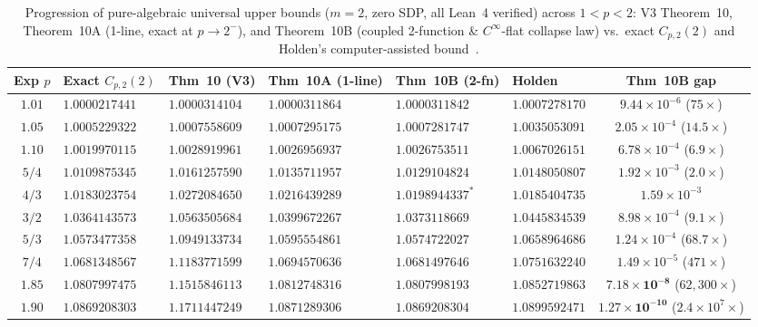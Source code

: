 \documentclass[10pt,letterpaper]{article}
\begin{document}
\begin{table}[htbp]
\centering
\caption{\small Progression of pure-algebraic universal upper bounds ($m = 2$, zero SDP, all Lean~4 verified) across $1 < p < 2$: V3 Theorem~10, Theorem~10A (1-line, exact at $p \to 2^-$), and Theorem~10B (coupled 2-function \& $C^\infty$-flat collapse law) vs.\ exact $C_{p,2}(2)$ and Holden's computer-assisted bound~\cite{Holden2026b}.}
\vspace{3pt}
\footnotesize
\setlength{\tabcolsep}{3.6pt}
\begin{tabular}{@{}c l l l l l c@{}}
\toprule
\textbf{Exp $p$} & \textbf{Exact $C_{p,2}(2)$} & \textbf{Thm~10 (V3)} & \textbf{Thm~10A (1-line)} & \textbf{Thm~10B (2-fn)} & \textbf{Holden~\cite{Holden2026b}} & \textbf{Thm~10B gap} \\
\midrule
$1.01$ & $1.0000217441$ & $1.0000314104$ & $1.0000311864$ & $\mathbf{1.0000311842}$ & $1.0007278170$ & $9.44\times 10^{-6}$ ($75\times$) \\
$1.05$ & $1.0005229322$ & $1.0007558609$ & $1.0007295175$ & $\mathbf{1.0007281747}$ & $1.0035053091$ & $2.05\times 10^{-4}$ ($14.5\times$) \\
$1.10$ & $1.0019970115$ & $1.0028919961$ & $1.0026956937$ & $\mathbf{1.0026753511}$ & $1.0067026151$ & $6.78\times 10^{-4}$ ($6.9\times$) \\
$5/4$  & $1.0109875345$ & $1.0161257590$ & $1.0135711957$ & $\mathbf{1.0129104824}$ & $1.0148050807$ & $1.92\times 10^{-3}$ ($2.0\times$) \\
$4/3$  & $1.0183023754$ & $1.0272084650$ & $1.0216439289$ & $1.0198944337^*$ & $1.0185404735$ & $1.59\times 10^{-3}$ \\
$3/2$  & $1.0364143573$ & $1.0563505684$ & $1.0399672267$ & $\mathbf{1.0373118669}$ & $1.0445834539$ & $8.98\times 10^{-4}$ ($9.1\times$) \\
$5/3$  & $1.0573477358$ & $1.0949133734$ & $1.0595554861$ & $\mathbf{1.0574722027}$ & $1.0658964686$ & $1.24\times 10^{-4}$ ($68.7\times$) \\
$7/4$  & $1.0681348567$ & $1.1183771599$ & $1.0694570636$ & $\mathbf{1.0681497646}$ & $1.0751632240$ & $1.49\times 10^{-5}$ ($471\times$) \\
$1.85$ & $1.0807997475$ & $1.1515846113$ & $1.0812748316$ & $\mathbf{1.0807998193}$ & $1.0852719863$ & $\mathbf{7.18\times 10^{-8}}$ ($62{,}300\times$) \\
$1.90$ & $1.0869208303$ & $1.1711447249$ & $1.0871289306$ & $\mathbf{1.0869208304}$ & $1.0899592471$ & $\mathbf{1.27\times 10^{-10}}$ ($2.4\times 10^7\times$) \\

\end{tabular}
\end{table}
\end{document}
